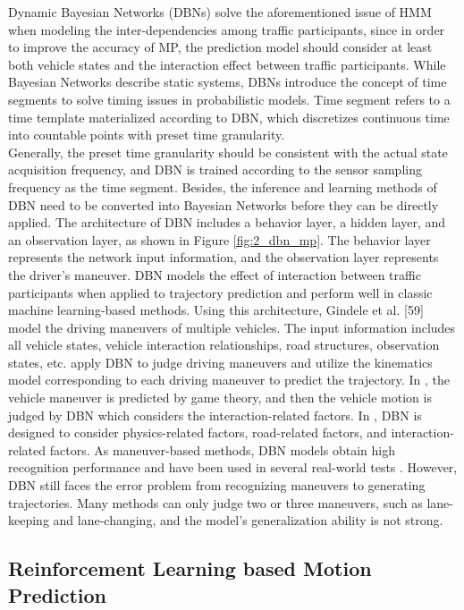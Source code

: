 Dynamic Bayesian Networks (DBNs) \cite{koller2009probabilistic} solve the aforementioned issue of HMM when modeling the inter-dependencies among traffic participants, since in order to improve the accuracy of \ac{MP}, the prediction model should consider at least both vehicle states and the interaction effect between traffic participants. While Bayesian Networks describe static systems, DBNs introduce the concept of time segments to solve timing issues in probabilistic models. Time segment refers to a time template materialized according to DBN, which discretizes continuous time into countable points with preset time granularity. \\

Generally, the preset time granularity should be consistent with the actual state acquisition frequency, and DBN is trained according to the sensor sampling frequency as the time segment. Besides, the inference and learning methods of DBN need to be converted into Bayesian Networks before they can be directly applied. The architecture of DBN includes a behavior layer, a hidden layer, and an observation layer, as shown in Figure \ref{fig:2_dbn_mp}. The behavior layer represents the network input information, and the observation layer represents the driver’s maneuver. DBN models the effect of interaction between traffic participants when applied to trajectory prediction and perform well in classic machine learning-based methods. Using this architecture, Gindele et al. [59] model the driving maneuvers of multiple vehicles. The input information includes all vehicle states, vehicle interaction relationships, road structures, observation states, etc. \cite{schreier2016integrated} apply DBN to judge driving maneuvers and utilize the kinematics model corresponding to each driving maneuver to predict the trajectory. In \cite{bahram2015game}, the vehicle maneuver is predicted by game theory, and then the vehicle motion is judged by DBN which considers the interaction-related factors. In \cite{li2019dynamic}, DBN is designed to consider physics-related factors, road-related factors, and interaction-related factors. As maneuver-based methods, DBN models obtain high recognition performance and have been used in several real-world tests \cite{weidl2014optimizing}. However, DBN still faces the error problem from recognizing maneuvers to generating trajectories. Many methods can only judge two or three maneuvers, such as lane-keeping and lane-changing, and the model’s generalization ability is not strong.

\subsection{Reinforcement Learning based Motion Prediction}
\label{sec:2_rl_based_mp}

